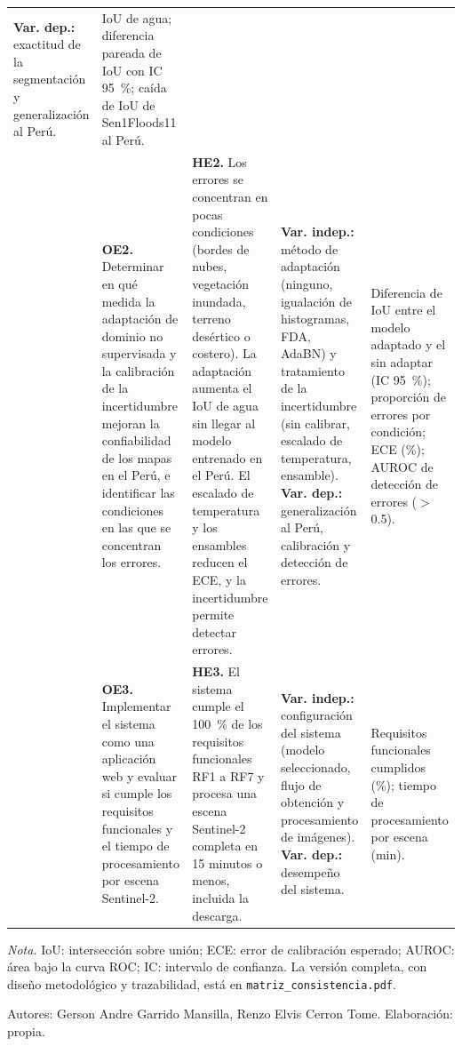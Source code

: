 \documentclass[10pt]{article}
\begin{document}
{\begin{tabular}{|L{3.6cm}|L{4.6cm}|L{5.2cm}|L{5.6cm}|L{5.6cm}|}
\textbf{Var. dep.:} exactitud de la segmentación y generalización al Perú.
&
IoU de agua; diferencia pareada de IoU con IC 95~\%; caída de IoU de Sen1Floods11 al Perú.
\\ 
&
\textbf{OE2.} Determinar en qué medida la adaptación de dominio no supervisada y la calibración de
la incertidumbre mejoran la confiabilidad de los mapas en el Perú, e identificar las condiciones
en las que se concentran los errores.
&
\textbf{HE2.} Los errores se concentran en pocas condiciones (bordes de nubes, vegetación
inundada, terreno desértico o costero). La adaptación aumenta el IoU de agua sin llegar al modelo
entrenado en el Perú. El escalado de temperatura y los ensambles reducen el ECE, y la
incertidumbre permite detectar errores.
&
\textbf{Var. indep.:} método de adaptación (ninguno, igualación de histogramas, FDA, AdaBN) y
tratamiento de la incertidumbre (sin calibrar, escalado de temperatura, ensamble).\newline
\textbf{Var. dep.:} generalización al Perú, calibración y detección de errores.
&
Diferencia de IoU entre el modelo adaptado y el sin adaptar (IC 95~\%); proporción de errores
por condición; ECE (\%); AUROC de detección de errores ($>$ 0.5).
\\ 
&
\textbf{OE3.} Implementar el sistema como una aplicación web y evaluar si cumple los requisitos
funcionales y el tiempo de procesamiento por escena Sentinel-2.
&
\textbf{HE3.} El sistema cumple el 100~\% de los requisitos funcionales RF1 a RF7 y procesa una
escena Sentinel-2 completa en 15 minutos o menos, incluida la descarga.
&
\textbf{Var. indep.:} configuración del sistema (modelo seleccionado, flujo de obtención y
procesamiento de imágenes).\newline
\textbf{Var. dep.:} desempeño del sistema.
&
Requisitos funcionales cumplidos (\%); tiempo de procesamiento por escena (min).
\\ \hline
\end{tabular}}

\medskip
{\footnotesize\raggedright
\textit{Nota.} IoU: intersección sobre unión; ECE: error de calibración esperado; AUROC: área bajo
la curva ROC; IC: intervalo de confianza. La versión completa, con diseño metodológico y
trazabilidad, está en \texttt{matriz\_consistencia.pdf}.\par\smallskip
Autores: Gerson Andre Garrido Mansilla, Renzo Elvis Cerron Tome. Elaboración: propia.}
\end{document}
